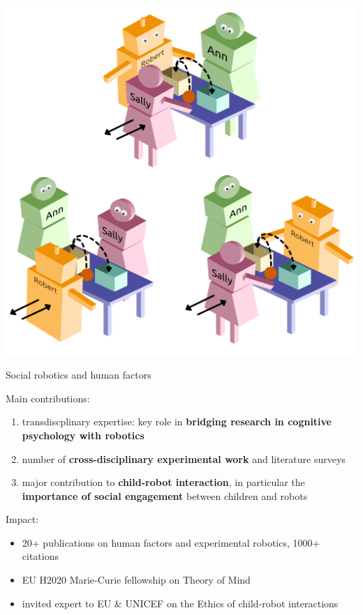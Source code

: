 \documentclass[xcolor=table]{beamer}
\begin{document}
\begin{frame}{}
            \hyperlink{constructs}{\includegraphics[height=0.2\paperheight]{triadic_false_beliefs}}

\end{frame}

\begin{frame}{Social robotics and human factors}

Main contributions:

    \begin{enumerate}
        \item transdiscplinary expertise: key role in \textbf{bridging research in cognitive psychology
            with robotics}
        \item number of \textbf{cross-disciplinary experimental work} and literature surveys
        \item major contribution to \textbf{child-robot interaction}, in
            particular the \textbf{importance of social engagement}
            between children and robots
    \end{enumerate}

Impact:
    \begin{itemize}
        \item 20+ publications on human factors and experimental robotics,
              1000+ citations
        \item EU H2020 Marie-Curie fellowship on Theory of Mind
        \item invited expert to EU \& UNICEF on the Ethics of child-robot
            interactions
    \end{itemize}
\end{frame}
\end{document}
